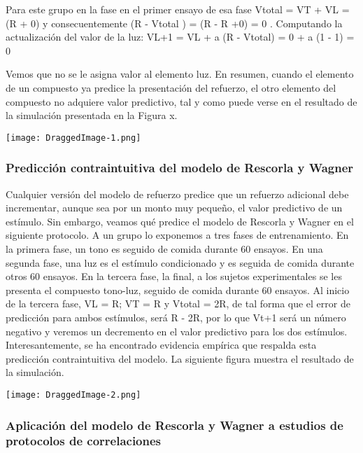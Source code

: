 \documentclass[
  a4paper,
  DIV=11,
  numbers=noendperiod]{scrreprt}
\begin{document}
Para este grupo en la fase en el primer ensayo de esa fase Vtotal = VT +
VL = (R + 0) y consecuentemente (R - Vtotal ) = (R - R +0) = 0 .
Computando la actualización del valor de la luz: VL+1 = VL + a (R -
Vtotal) = 0 + a (1 - 1) = 0

Vemos que no se le asigna valor al elemento luz. En resumen, cuando el
elemento de un compuesto ya predice la presentación del refuerzo, el
otro elemento del compuesto no adquiere valor predictivo, tal y como
puede verse en el resultado de la simulación presentada en la Figura x.

\texttt{[image: DraggedImage-1.png]}

\subsubsection{Predicción contraintuitiva del modelo de Rescorla y
Wagner}\label{predicciuxf3n-contraintuitiva-del-modelo-de-rescorla-y-wagner}

Cualquier versión del modelo de refuerzo predice que un refuerzo
adicional debe incrementar, aunque sea por un monto muy pequeño, el
valor predictivo de un estímulo. Sin embargo, veamos qué predice el
modelo de Rescorla y Wagner en el siguiente protocolo. A un grupo lo
exponemos a tres fases de entrenamiento. En la primera fase, un tono es
seguido de comida durante 60 ensayos. En una segunda fase, una luz es el
estímulo condicionado y es seguida de comida durante otros 60 ensayos.
En la tercera fase, la final, a los sujetos experimentales se les
presenta el compuesto tono-luz, seguido de comida durante 60 ensayos. Al
inicio de la tercera fase, VL = R; VT = R y Vtotal = 2R, de tal forma
que el error de predicción para ambos estímulos, será R - 2R, por lo que
Vt+1 será un número negativo y veremos un decremento en el valor
predictivo para los dos estímulos. Interesantemente, se ha encontrado
evidencia empírica que respalda esta predicción contraintuitiva del
modelo. La siguiente figura muestra el resultado de la simulación.

\texttt{[image: DraggedImage-2.png]}

\subsubsection{Aplicación del modelo de Rescorla y Wagner a estudios de
protocolos de
correlaciones}\label{aplicaciuxf3n-del-modelo-de-rescorla-y-wagner-a-estudios-de-protocolos-de-correlaciones}
\end{document}
